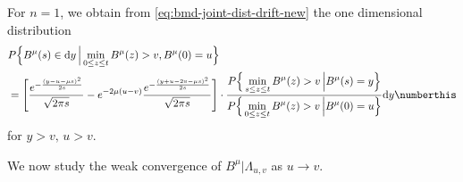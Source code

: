 \begin{corollary}
	For $ n=1 $, we obtain from \eqref{eq:bmd-joint-dist-drift-new} the one dimensional 
	distribution 
	\begin{align*}
		&P \Big\{  
		B^{\mu}  (s) \in \mathrm d y \, \Big | \min_{0\leq z \leq t} B^\mu(z)> v , B^\mu(0)=u 
		 \Big\}  \\
		&=
		 \Bigg[
		\frac{
			e^{- \frac{ (y - u - \mu s )^2}{2 s } } 
		}{ %
			\sqrt{2\pi s } } - 
		e^{ - 2 \mu (u - v)} 
		\frac{
			e^{- \frac{ (y + u - 2v - \mu s )^2}{2 s } } 
		}{ %
			\sqrt{2\pi s } }	\Bigg]   \cdot  
		\frac{\displaystyle 
			P \Big\{   \min_{s\leq z \leq t} B^\mu(z)> v  \, \Big \vert B^\mu (s) = y 
			\Big \} 
		}{
			\displaystyle
			P \Big \{  \min_{0\leq z \leq t} B^{\mu}(z)> v \,  \Big \vert  B^{\mu}(0) = u  \Big\}
		}  \mathrm d y
	  \numberthis \label{eq:bmd-onedim-dist-drift-new}
	\end{align*}
	for $ y>v, \, u>v $.
\end{corollary}
%
%
%
We now study the weak convergence of $ B^\mu | \Lambda_{u,v} $ as $ u \to v $. 



%
%
%



